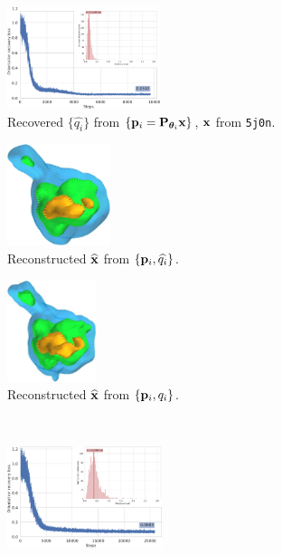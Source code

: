 \begin{figure}[t]
    \centering
    \begin{subfigure}[b]{0.44\linewidth}
        \centering
        \includegraphics[width=\linewidth,height=8em]{figures/5j0n_noise0_ar_aa}
        \caption{Recovered $\{ \widehat{q_i} \}$ from $\{ \mathbf{p}_i = \mathbf{P}_{{\boldsymbol{\theta}}_i} \mathbf{x} \}$, $\mathbf{x}$ from \texttt{5j0n}.}%
        \label{fig:5j0n-noise0-orientation-recovery}
    \end{subfigure}
    \hfill
    \begin{subfigure}[b]{0.26\linewidth}
        \centering
        \includegraphics[height=8em]{figures/5j0n_reconstruction_noise0}
        \caption{Reconstructed $\widehat{\mathbf{x}}$ from $\{ \mathbf{p}_i, \widehat{q_i} \}$.}%
        \label{fig:5j0n-noise0-reconstruction-recovered}
    \end{subfigure}
    \hfill
    \begin{subfigure}[b]{0.26\linewidth}
        \centering
        \includegraphics[height=8em]{figures/5j0n_reconstruction_GT}
        \caption{Reconstructed $\widehat{\mathbf{x}}$ from $\{ \mathbf{p}_i, q_i \}$.}%
        \label{fig:5j0n-noise0-reconstruction-true}
    \end{subfigure}
    \\ \vspace{1em}
    \begin{subfigure}[b]{0.44\linewidth}
        \centering
        \includegraphics[width=\linewidth,height=8em]{figures/5j0n_noise16_ar_aa}

\end{subfigure}
\end{figure}
